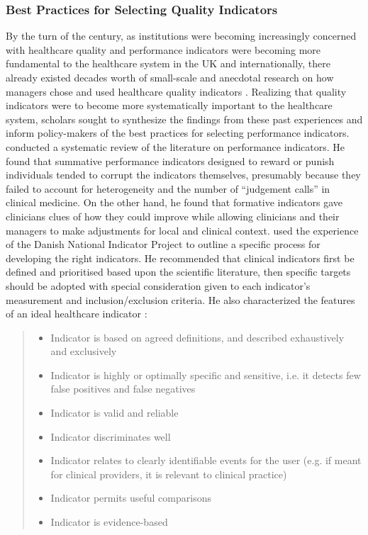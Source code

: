 \documentclass[12pt]{article}
\begin{document}
\subsubsection{Best Practices for Selecting Quality Indicators}

By the turn of the century, as institutions were becoming increasingly concerned with healthcare quality and performance indicators were becoming more fundamental to the healthcare system in the UK and internationally, there already existed decades worth of small-scale and anecdotal research on how managers chose and used healthcare quality indicators \citep{starkweatherDelphiForecastingHealth1975,grimesApproachIndexHospital1976}. Realizing that quality indicators were to become more systematically important to the healthcare system, scholars sought to synthesize the findings from these past experiences and inform policy-makers of the best practices for selecting performance indicators. \citet{freemanUsingPerformanceIndicators2002} conducted a systematic review of the literature on performance indicators. He found that summative performance indicators designed to reward or punish individuals tended to corrupt the indicators themselves, presumably because they failed to account for heterogeneity and the number of ``judgement calls'' in clinical medicine. On the other hand, he found that formative indicators gave clinicians clues of how they could improve while allowing clinicians and their managers to make adjustments for local and clinical context. \citep{mainzDevelopingEvidencebasedClinical2003} used the experience of the Danish National Indicator Project to outline a specific process for developing the right indicators. He recommended that clinical indicators first be defined and prioritised based upon the scientific literature, then specific targets should be adopted with special consideration given to each indicator's measurement and inclusion/exclusion criteria. He also characterized the features of an ideal healthcare indicator \citep{mainzDefiningClassifyingClinical2003}:

\begin{quote}
\begin{itemize}
  \item Indicator is based on agreed definitions, and described exhaustively and exclusively
  \item Indicator is highly or optimally specific and sensitive, i.e. it detects few false positives and false negatives
  \item Indicator is valid and reliable
  \item Indicator discriminates well
  \item Indicator relates to clearly identifiable events for the user (e.g. if meant for clinical providers, it is relevant to clinical practice)
  \item Indicator permits useful comparisons
  \item Indicator is evidence-based
\end{itemize}
\end{quote}
\end{document}
